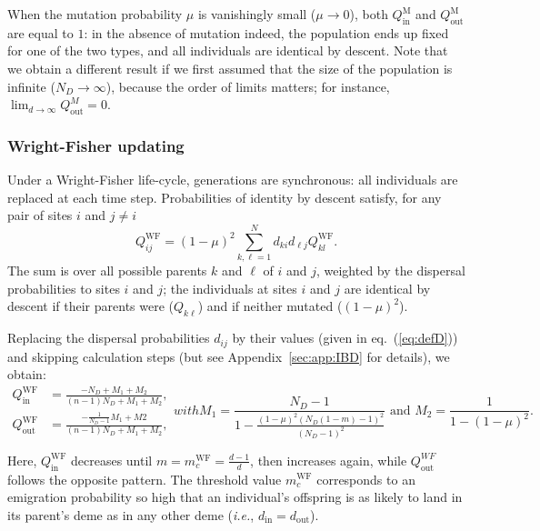 \documentclass[11pt, letterpaper]{article}
\renewcommand{\eqref}[1]{\textup{{\normalfont eq.~(\ref{#1}}\normalfont)}}
\newcommand{\ie}{\textit{i.e.}}
\newcommand{\appname}[0]{Appendix}
\newcommand{\Moran}{\textrm{M}}
\newcommand{\WF}{\textrm{WF}}
\newcommand{\din}{d_{\textrm{in}}}
\newcommand{\dout}{d_{\textrm{out}}}
\newcommand{\Qin}{Q_{\textrm{in}}}
\newcommand{\Qout}{Q_{\textrm{out}}}
\newcommand{\ndemes}{N_D}
\begin{document}
When the mutation probability $\mu$ is vanishingly small ($\mu \to 0$), both $\Qin^{\Moran}$ and $\Qout^{\Moran}$ are equal to $1$: in the absence of mutation indeed, the population ends up fixed for one of the two types, and all individuals are identical by descent. Note that we obtain a different result if we first assumed that the size of the population is infinite ($\ndemes \to \infty$), because the order of limits matters; %
for instance, $\lim_{d\to \infty} \Qout^{M}=0$. 


\subsubsection{Wright-Fisher updating}

Under a Wright-Fisher life-cycle, generations are synchronous: all individuals are replaced at each time step. Probabilities of identity by descent satisfy, for any pair of sites $i$ and $j \neq i$
\begin{equation}
Q_{ij}^{\WF} = (1-\mu)^2 \sum_{k,\ell = 1}^N d_{ki} d_{\ell j} Q_{kl}^{\WF}.
\end{equation}
The sum is over all possible parents $k$ and $\ell$ of $i$ and $j$, weighted by the dispersal probabilities to sites $i$ and $j$; the individuals at sites $i$ and $j$ are identical by descent if their parents were ($Q_{k\ell}$) and if neither mutated ($(1-\mu)^2$). 

Replacing the dispersal probabilities $d_{ij}$ by their values (given in \eqref{eq:defD}) and skipping calculation steps (but see \appname~\ref{sec:app:IBD} for details), we obtain:
%
\begin{subequations}\label{eq:QWF}
\begin{align}
\Qin^{\WF} &= \frac{-\ndemes + M_1 + M_2}{(n-1) \ndemes +M_1 + M_2}, \\
\Qout^{\WF} & = \frac{-\frac{1}{\ndemes-1}M_1 + M2}{(n-1) \ndemes +M_1 + M_2},
\end{align}
with
\begin{equation*}
M_1 = \frac{\ndemes-1}{1-\frac{(1-\mu )^2 (\ndemes (1-m)-1)^2}{(\ndemes-1)^2}} \textrm{ and }M_2 = \frac{1}{1-(1-\mu)^2}.
\end{equation*}
\end{subequations}

Here, $\Qin^{\WF}$ decreases until $m=m_c^{\WF} = \frac{d-1}{d}$, then increases again, while $\Qout^{WF}$ follows the opposite pattern. The threshold value $m_c^{\WF}$ corresponds to an emigration probability so high that an individual's offspring is as likely to land in its parent's deme as in any other deme (\ie, $\din = \dout$).
\end{document}
